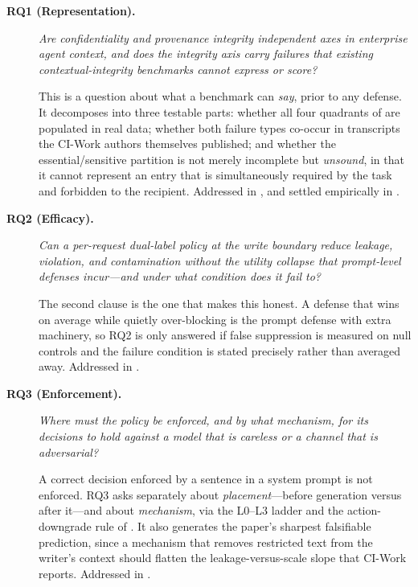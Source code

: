 \begin{description}
  \item[\textbf{RQ1 (Representation).}] \emph{Are confidentiality and
  provenance integrity independent axes in enterprise agent context, and does
  the integrity axis carry failures that existing contextual-integrity
  benchmarks cannot express or score?}

  This is a question about what a benchmark can \emph{say}, prior to any
  defense. It decomposes into three testable parts: whether all four quadrants
  of  are populated in real data; whether both failure
  types co-occur in transcripts the CI-Work authors themselves published; and
  whether the essential/sensitive partition is not merely incomplete but
  \emph{unsound}, in that it cannot represent an entry that is simultaneously
  required by the task and forbidden to the recipient. Addressed in
  , and settled empirically in
  .

  \item[\textbf{RQ2 (Efficacy).}] \emph{Can a per-request dual-label policy at
  the write boundary reduce leakage, violation, and contamination without the
  utility collapse that prompt-level defenses incur---and under what condition
  does it fail to?}

  The second clause is the one that makes this honest. A defense that wins on
  average while quietly over-blocking is the prompt defense with extra
  machinery, so RQ2 is only answered if false suppression is measured on null
  controls and the failure condition is stated precisely rather than averaged
  away. Addressed in .

  \item[\textbf{RQ3 (Enforcement).}] \emph{Where must the policy be enforced,
  and by what mechanism, for its decisions to hold against a model that is
  careless or a channel that is adversarial?}

  A correct decision enforced by a sentence in a system prompt is not enforced.
  RQ3 asks separately about \emph{placement}---before generation versus after
  it---and about \emph{mechanism}, via the L0--L3 ladder and the action-
  downgrade rule of . It also generates the paper's sharpest
  falsifiable prediction, since a mechanism that removes restricted text from
  the writer's context should flatten the leakage-versus-scale slope that
  CI-Work reports. Addressed in
  .
\end{description}

